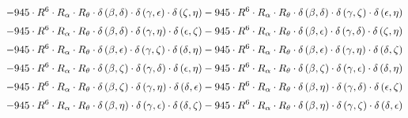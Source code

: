 \begin{subequations}
\begin{gather}
 \\[0.2em] \notag 		 - 945 \cdot R^{6} \cdot R_{\alpha{}} \cdot R_{\theta{}} \cdot \delta{}\left(\beta{}, \delta{}\right) \cdot \delta{}\left(\gamma{}, \epsilon{}\right) \cdot \delta{}\left(\zeta{}, \eta{}\right)- 945 \cdot R^{6} \cdot R_{\alpha{}} \cdot R_{\theta{}} \cdot \delta{}\left(\beta{}, \delta{}\right) \cdot \delta{}\left(\gamma{}, \zeta{}\right) \cdot \delta{}\left(\epsilon{}, \eta{}\right) 
 \\[0.2em] \notag 		 - 945 \cdot R^{6} \cdot R_{\alpha{}} \cdot R_{\theta{}} \cdot \delta{}\left(\beta{}, \delta{}\right) \cdot \delta{}\left(\gamma{}, \eta{}\right) \cdot \delta{}\left(\epsilon{}, \zeta{}\right)- 945 \cdot R^{6} \cdot R_{\alpha{}} \cdot R_{\theta{}} \cdot \delta{}\left(\beta{}, \epsilon{}\right) \cdot \delta{}\left(\gamma{}, \delta{}\right) \cdot \delta{}\left(\zeta{}, \eta{}\right) 
 \\[0.2em] \notag 		 - 945 \cdot R^{6} \cdot R_{\alpha{}} \cdot R_{\theta{}} \cdot \delta{}\left(\beta{}, \epsilon{}\right) \cdot \delta{}\left(\gamma{}, \zeta{}\right) \cdot \delta{}\left(\delta{}, \eta{}\right)- 945 \cdot R^{6} \cdot R_{\alpha{}} \cdot R_{\theta{}} \cdot \delta{}\left(\beta{}, \epsilon{}\right) \cdot \delta{}\left(\gamma{}, \eta{}\right) \cdot \delta{}\left(\delta{}, \zeta{}\right) 
 \\[0.2em] \notag 		 - 945 \cdot R^{6} \cdot R_{\alpha{}} \cdot R_{\theta{}} \cdot \delta{}\left(\beta{}, \zeta{}\right) \cdot \delta{}\left(\gamma{}, \delta{}\right) \cdot \delta{}\left(\epsilon{}, \eta{}\right)- 945 \cdot R^{6} \cdot R_{\alpha{}} \cdot R_{\theta{}} \cdot \delta{}\left(\beta{}, \zeta{}\right) \cdot \delta{}\left(\gamma{}, \epsilon{}\right) \cdot \delta{}\left(\delta{}, \eta{}\right) 
 \\[0.2em] \notag 		 - 945 \cdot R^{6} \cdot R_{\alpha{}} \cdot R_{\theta{}} \cdot \delta{}\left(\beta{}, \zeta{}\right) \cdot \delta{}\left(\gamma{}, \eta{}\right) \cdot \delta{}\left(\delta{}, \epsilon{}\right)- 945 \cdot R^{6} \cdot R_{\alpha{}} \cdot R_{\theta{}} \cdot \delta{}\left(\beta{}, \eta{}\right) \cdot \delta{}\left(\gamma{}, \delta{}\right) \cdot \delta{}\left(\epsilon{}, \zeta{}\right) 
 \\[0.2em] \notag 		 - 945 \cdot R^{6} \cdot R_{\alpha{}} \cdot R_{\theta{}} \cdot \delta{}\left(\beta{}, \eta{}\right) \cdot \delta{}\left(\gamma{}, \epsilon{}\right) \cdot \delta{}\left(\delta{}, \zeta{}\right)- 945 \cdot R^{6} \cdot R_{\alpha{}} \cdot R_{\theta{}} \cdot \delta{}\left(\beta{}, \eta{}\right) \cdot \delta{}\left(\gamma{}, \zeta{}\right) \cdot \delta{}\left(\delta{}, \epsilon{}\right) 

\end{gather}
\end{subequations}
